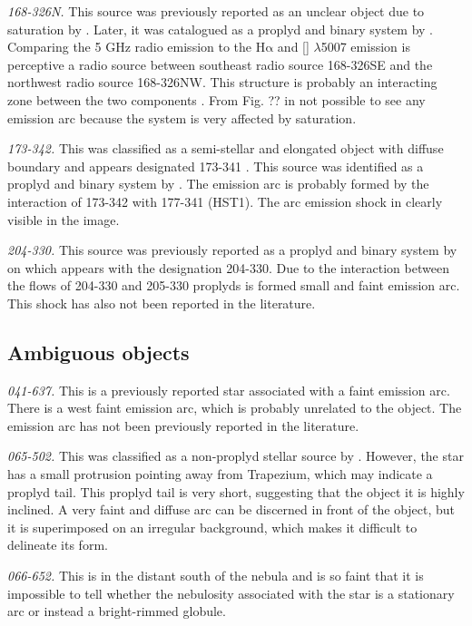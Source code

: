 \documentclass[apj, twocolumn]{aastex63}
\newcommand\oiii{[\ion{O}{3}]}
\newcommand\ha{\ensuremath{\mathrm{H\alpha}}}
\renewcommand\clearpage{}
\begin{document}
\textit{168-326N.} This source was previously reported as an unclear object
due to saturation by \citet{ODell:1994a}. Later, it was catalogued as a proplyd
and binary system by \citet{Ricci:2008a}. Comparing the 5 GHz radio emission
to the \ha{} and \oiii{} $\lambda$5007 emission is perceptive a radio source
between southeast radio source 168-326SE and the northwest radio source
168-326NW. This structure is probably an interacting zone between the two
components \citep{Graham:2002a}. From Fig. ?? in not possible to see
any emission arc because the system is very affected by saturation.    

\textit{173-342.} This was classified as a semi-stellar and elongated
object with diffuse boundary and appears designated 173-341 \citet{ODell:1994a}.
This source was identified as a proplyd and binary system by \citet{Ricci:2008a}.
The emission arc is probably formed by the interaction of 173-342 with
177-341 (HST1). The arc emission shock in clearly visible in the image. 

\textit{204-330.} This source was previously reported as a proplyd and binary
system by \citet{Ricci:2008a} on which appears with the designation 204-330.
Due to the interaction between the flows of 204-330 and 205-330 proplyds is
formed small and faint emission arc. This shock has also not been reported
in the literature.

\clearpage
\subsection{Ambiguous objects}
\label{sec:problematic-objects}

\textit{041-637.} This is a previously reported star \citep{Da-Rio:2009a}
associated with a faint emission arc. There is a west faint emission arc,
which is probably unrelated to the object. The emission arc has not been
previously reported in the literature.

\textit{065-502.} This was classified as a non-proplyd stellar source
by \citet{ODell:1996a}. However, the star has a small protrusion
pointing away from Trapezium, which may indicate a proplyd tail. This
proplyd tail is very short, suggesting that the object it is highly
inclined.  A very faint and diffuse arc can be discerned in front of
the object, but it is superimposed on an irregular background, which
makes it difficult to delineate its form.

\textit{066-652.}  This is in the distant south of the nebula and is
so faint that it is impossible to tell whether the nebulosity
associated with the star is a stationary arc or instead a
bright-rimmed globule.
\end{document}
